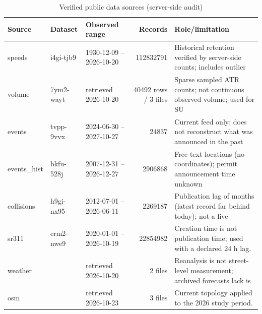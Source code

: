 \begin{table}[t]\centering\caption{Verified public data sources (server-side audit)}\label{tab:sources}\small
\begin{tabular}{lllrl}\toprule Source & Dataset & Observed range & Records & Role/limitation \\ \midrule
speeds & i4gi-tjb9 & 1930-12-09 -- 2026-10-20 & 112832791 & Historical retention verified by server-side counts; includes outlier  \\
volume & 7ym2-wayt & retrieved 2026-10-20 & 40492 rows / 3 files & Sparse sampled ATR counts; not continuous observed volume; used for SU \\
events & tvpp-9vvx & 2024-06-30 -- 2027-10-27 & 24837 & Current feed only; does not reconstruct what was announced in the past \\
events\_hist & bkfu-528j & 2007-12-31 -- 2026-12-27 & 2906868 & Free-text locations (no coordinates); permit announcement time unknown \\
collisions & h9gi-nx95 & 2012-07-01 -- 2026-06-11 & 2269187 & Publication lag of months (latest record far behind today); not a live \\
sr311 & erm2-nwe9 & 2020-01-01 -- 2026-10-19 & 22854982 & Creation time is not publication time; used with a declared 24 h lag. \\
weather &  & retrieved 2026-10-20 & 2 files & Reanalysis is not street-level measurement; archived forecasts lack is \\
osm &  & retrieved 2026-10-23 & 3 files & Current topology applied to the 2026 study period. \\
\bottomrule\end{tabular}\end{table}
